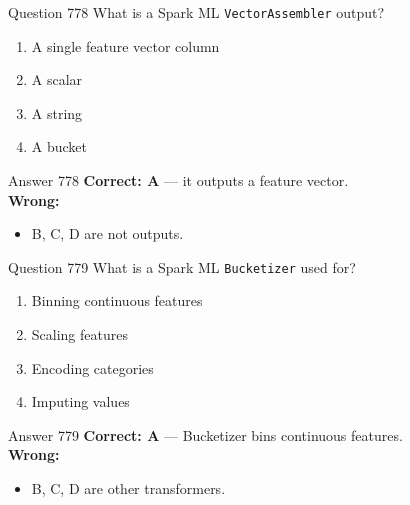 \documentclass[aspectratio=169,11pt]{beamer}
\begin{document}
	\begin{frame}{Question 778}
		What is a Spark ML \texttt{VectorAssembler} output?
		\begin{enumerate}[label=\Alph*.]
			\item A single feature vector column
			\item A scalar
			\item A string
			\item A bucket
		\end{enumerate}
	\end{frame}
	\begin{frame}{Answer 778}
		\textbf{Correct: A} --- it outputs a feature vector.\\
		\vspace{0.5em}
		\textbf{Wrong:}
		\begin{itemize}
			\item B, C, D are not outputs.
		\end{itemize}
	\end{frame}
	
	\begin{frame}{Question 779}
		What is a Spark ML \texttt{Bucketizer} used for?
		\begin{enumerate}[label=\Alph*.]
			\item Binning continuous features
			\item Scaling features
			\item Encoding categories
			\item Imputing values
		\end{enumerate}
	\end{frame}
	\begin{frame}{Answer 779}
		\textbf{Correct: A} --- Bucketizer bins continuous features.\\
		\vspace{0.5em}
		\textbf{Wrong:}
		\begin{itemize}
			\item B, C, D are other transformers.
		\end{itemize}
	\end{frame}
	
\end{document}
